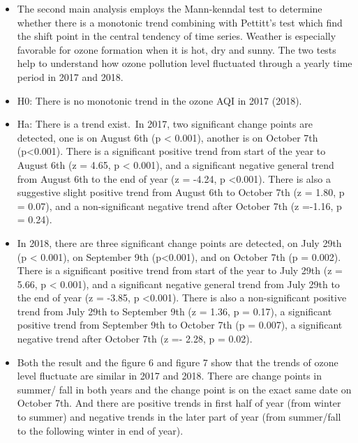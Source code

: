 \documentclass[12pt,]{article}
\begin{document}
\begin{itemize}
\item[]The second main analysis employs the Mann-kenndal test to determine whether there is a monotonic trend combining with Pettitt's test which find the shift point in the central tendency of time series. Weather is especially favorable for ozone formation when it is hot, dry and sunny. The two tests help to understand how ozone pollution level fluctuated through a yearly time period in 2017 and 2018.
\item[]H0: There is no monotonic trend in the ozone AQI in 2017 (2018).  \
\item[]Ha: There is a trend exist.\
 In 2017, two significant change points are detected, one is on August 6th (p < 0.001), another is on October 7th (p<0.001). There is a significant positive trend from start of the year to August 6th (z = 4.65, p < 0.001), and a significant negative general trend from August 6th to the end of year (z = -4.24, p <0.001). There is also a suggestive slight positive trend from August 6th to October 7th (z = 1.80, p = 0.07), and a non-significant negative trend after October 7th (z =-1.16, p = 0.24).
\item[]In 2018, there are three significant change points are detected, on July 29th (p < 0.001), on September 9th (p<0.001), and on October 7th (p = 0.002). There is a significant positive trend from start of the year to July 29th (z = 5.66, p < 0.001), and a significant negative general trend from July 29th to the end of year (z = -3.85, p <0.001). There is also a non-significant positive trend from July 29th to September 9th (z = 1.36, p = 0.17), a significant positive trend from September 9th to October 7th (p = 0.007), a significant negative trend after October 7th (z =- 2.28, p = 0.02).
\item[]Both the result and the figure 6 and figure 7 show that the trends of ozone level fluctuate are similar in 2017 and 2018. There are change points in summer/ fall in both years and the change point is on the exact same date on October 7th. And there are positive trends in first half of year (from winter to summer) and negative trends in the later part of year (from summer/fall to the following winter in end of year).
\end{itemize}
\end{document}
